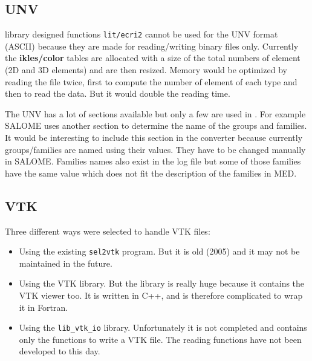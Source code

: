 \subsection{UNV}

\bief library designed functions \verb+lit/ecri2+ cannot be used for the UNV
format (ASCII) because they are made for reading/writing binary files only.
Currently the \textbf{ikles/color} tables are allocated with a size of the
total numbers of element (2D and 3D elements) and are then resized.  Memory
would be optimized by reading the file twice, first to compute the number of
element of each type and then to read the data. But it would double the reading
time.

The UNV has a lot of sections available but only a few are used in \estel. For
example SALOME uses another section to determine the name of the groups and
families.  It would be interesting to include this section in the converter
because currently groups/families are named using their values. They have to be
changed manually in SALOME. Families names also exist in the log file but some of
those families have the same value which does not fit the description of the
families in MED.

\subsection{VTK}

Three different ways were selected to handle VTK files:

\begin{itemize}
\item Using the existing \verb+sel2vtk+ program. But it is old (2005) and it
may not be maintained in the future.
\item Using the VTK library. But the library is really huge because it
contains the VTK viewer too.  It is written in C++, and is therefore
complicated to wrap it in Fortran.
\item Using the \verb+lib_vtk_io+ library. Unfortunately it is not completed
and contains only the functions to write a VTK file.  The reading functions
have not been developed to this day.
\end{itemize}

